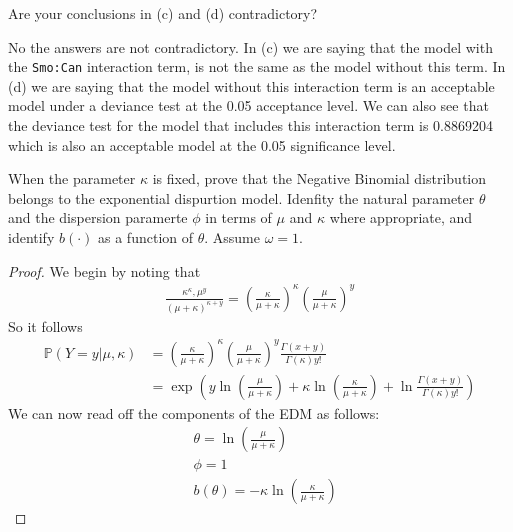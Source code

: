 \documentclass[nocolor]{report}
\begin{document}
\begin{ex}[Question 2e] 
    Are your conclusions in (c) and (d) contradictory?
\end{ex}
\vspace{-10pt}
\begin{soln}
    No the answers are not contradictory. In (c) we are saying that the model with the \texttt{Smo:Can}
interaction term, is not the same as the model without this term. In (d) we are saying that the model
without this interaction term is an acceptable model under a deviance test at the 0.05 acceptance
level. We can also see that the deviance test for the model that includes this interaction term is
0.8869204 which is also an acceptable model at the 0.05 significance level.
\end{soln}

\newpage
\begin{ex}[Question 3a] When the parameter $\kappa$ is fixed, prove that the Negative Binomial distribution belongs to the exponential dispurtion model. Idenfity the natural parameter $\theta$ and the dispersion paramerte $\phi$ in terms of $\mu$ and $\kappa$ where appropriate, and identify $b(\cdot)$ as a function of $\theta$. Assume $\omega = 1$.
\end{ex}
\begin{proof}
    We begin by noting that 
    \begin{align*}
        \frac{\kappa^\kappa, \mu^y}{(\mu+\kappa)^{\kappa + y}} = \left(\frac{\kappa}{\mu+\kappa}\right)^\kappa \left(\frac{\mu}{\mu+\kappa}\right)^y
    \end{align*}
    So it follows 
    \begin{align*}
        \mathbb{P}(Y = y | \mu, \kappa) &= \left(\frac{\kappa}{\mu+\kappa}\right)^\kappa \left(\frac{\mu}{\mu+\kappa}\right)^y \frac{\Gamma(x+y)}{\Gamma(\kappa)y!} \\
        &= \exp\left( y \ln\left(\frac{\mu}{\mu+\kappa}\right) + \kappa \ln \left(\frac{\kappa}{\mu+\kappa}\right) + \ln  \frac{\Gamma(x+y)}{\Gamma(\kappa)y!}\right)
    \end{align*}
    We can now read off the components of the EDM as follows: 
    \begin{align*}
        & \theta = \ln \left(\frac{\mu}{\mu+\kappa}\right) \\
        & \phi = 1 \\
        & b(\theta) = -\kappa \ln \left(\frac{\kappa}{\mu+\kappa}\right)
    \end{align*}
\end{proof}
\end{document}
